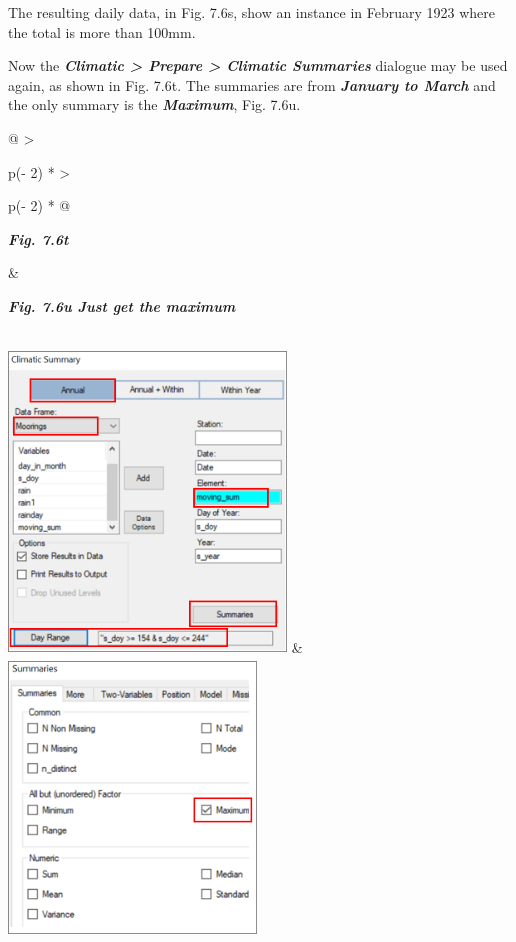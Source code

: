 \documentclass[
  letterpaper,
  DIV=11,
  numbers=noendperiod]{scrreprt}
\begin{document}
The resulting daily data, in Fig. 7.6s, show an instance in February
1923 where the total is more than 100mm.

Now the \textbf{\emph{Climatic \textgreater{} Prepare \textgreater{}
Climatic Summaries}} dialogue may be used again, as shown in Fig. 7.6t.
The summaries are from \textbf{\emph{January to March}} and the only
summary is the \textbf{\emph{Maximum}}, Fig. 7.6u.

\begin{longtable}[]{@{}
  >{\raggedright\arraybackslash}p{(\columnwidth - 2\tabcolsep) * }
  >{\raggedright\arraybackslash}p{(\columnwidth - 2\tabcolsep) * }@{}}
\toprule\noalign{}
\begin{minipage}[b]{\linewidth}\raggedright
\textbf{\emph{Fig. 7.6t}}
\end{minipage} & \begin{minipage}[b]{\linewidth}\raggedright
\textbf{\emph{Fig. 7.6u Just get the maximum}}
\end{minipage} \\
\midrule\noalign{}
\endhead
\bottomrule\noalign{}
\endlastfoot
\includegraphics[width=2.9062in,height=3.15847in]{figures/Fig7.6t.png} &
\includegraphics[width=2.5901in,height=2.91316in]{figures/Fig7.6u.png} \\
\end{longtable}
\end{document}
